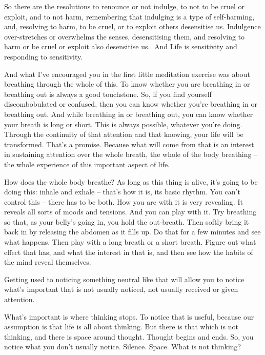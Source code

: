 So there are the resolutions to renounce or not indulge, to not to be cruel or
exploit, and to not harm, remembering that indulging is a type of self-harming,
and, resolving to harm, to be cruel, or to exploit others desensitise us.
Indulgence over-stretches or overwhelms the senses, desensitising them, and
resolving to harm or be cruel or exploit also desensitise us.. And Life is
sensitivity and responding to sensitivity.

\enlargethispage{\baselineskip}

And what I've encouraged you in the first little meditation exercise was about
breathing through the whole of this. To know whether you are breathing in or
breathing out is always a good touchstone. So, if you find yourself
discombobulated or confused, then you can know whether you're breathing in or
breathing out. And while breathing in or breathing out, you can know whether
your breath is long or short. This is always possible, whatever you're doing.
Through the continuity of that attention and that knowing, your life will be
transformed. That's a promise. Because what will come from that is an interest
in sustaining attention over the whole breath, the whole of the body breathing
-- the whole experience of this important aspect of life.

How does the whole body breathe? As long as this thing is alive, it's going to
be doing this: inhale and exhale -- that's how it is, its basic rhythm. You
can't control this -- there has to be both. How you are with it is very
revealing. It reveals all sorts of moods and tensions. And you can play with it.
Try breathing so that, as your belly's going in, you hold the out-breath. Then
softly bring it back in by releasing the abdomen as it fills up. Do that for a
few minutes and see what happens. Then play with a long breath or a short
breath. Figure out what effect that has, and what the interest in that is, and
then see how the habits of the mind reveal themselves.

Getting used to noticing something neutral like that will allow you to notice
what's important that is not usually noticed, not usually received or given
attention.

What's important is where thinking stops. To notice that is useful, because our
assumption is that life is all about thinking. But there is that which is not
thinking, and there is space around thought. Thought begins and ends. So, you
notice what you don't usually notice. Silence. Space. What is not thinking?

